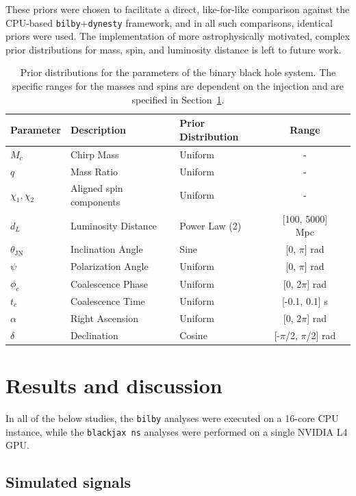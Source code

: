 \documentclass[fleqn,usenatbib]{mnras}
\begin{document}
These priors were chosen to facilitate a direct, like-for-like
comparison against the CPU-based \texttt{bilby}+\texttt{dynesty}
framework, and in all such comparisons, identical priors were used. The
implementation of more astrophysically motivated, complex prior
distributions for mass, spin, and luminosity distance is left to
future work.

\begin{table}[h!]
\setlength{\tabcolsep}{3pt} %
\centering
\caption{Prior distributions for the parameters of the binary black hole
system. The specific ranges for the masses and spins
 are dependent on the injection and are specified in Section~\ref{sec:results}.}
\label{tab:priors}
\begin{tabular}{l l l c c}
\hline
\hline
\textbf{Parameter} & \textbf{Description} & \textbf{Prior Distribution} & \textbf{Range}\\
\hline
$M_c$ & Chirp Mass & Uniform & - \\
$q$ & Mass Ratio & Uniform & - \\
$\chi_1, \chi_2$ & Aligned spin components & Uniform & - \\
$d_L$ & Luminosity Distance & Power Law (2) & [100, 5000] Mpc \\
$\theta_{\textrm{JN}}$ & Inclination Angle & Sine & [0, $\pi$] rad \\
$\psi$ & Polarization Angle & Uniform & [0, $\pi$] rad \\
$\phi_c$ & Coalescence Phase & Uniform & [0, 2$\pi$] rad \\
$t_c$ & Coalescence Time & Uniform & [-0.1, 0.1] s\\
$\alpha$ & Right Ascension & Uniform & [0, 2$\pi$] rad \\
$\delta$ & Declination & Cosine & [-$\pi$/2, $\pi$/2] rad \\
\hline
\hline
\end{tabular}
\end{table}


\section{Results and discussion}
\label{sec:results}

In all of the below studies, the \texttt{bilby} analyses
were executed on a 16-core CPU instance, while the \texttt{blackjax ns}
analyses were performed on a single NVIDIA L4 GPU.

\subsection{Simulated signals}
\end{document}
